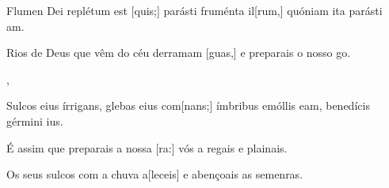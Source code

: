 {  {\item {}Flumen Dei replétum est [quis;] parásti fruménta il[rum,] quóniam ita parásti am.~\Responsorium}%
    {\item {}Rios de Deus que vêm do céu derramam [guas,] e preparais o nosso go.~\Responsorium},
  {\item {}Sulcos eius írrigans, glebas eius com[nans;] ímbribus emóllis eam, benedícis gérmini ius.~\Responsorium}%
    {\item {}É assim que preparais a nossa [ra:] vós a regais e plainais.~\Responsorium
      \item {}Os seus sulcos com a chuva a[leceis] e abençoais as semenras.~\Responsorium}
}